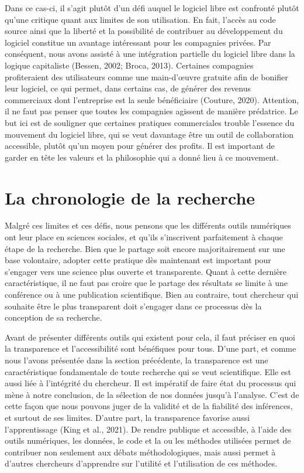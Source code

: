 \documentclass[
  letterpaper,
  DIV=11,
  numbers=noendperiod]{scrreprt}
\begin{document}
Dans ce cas-ci, il s'agit plutôt d'un défi auquel le logiciel libre est
confronté plutôt qu'une critique quant aux limites de son utilisation.
En fait, l'accès au code source ainsi que la liberté et la possibilité
de contribuer au développement du logiciel constitue un avantage
intéressant pour les compagnies privées. Par conséquent, nous avons
assisté à une intégration partielle du logiciel libre dans la logique
capitaliste (Bessen, 2002; Broca, 2013). Certaines compagnies
profiteraient des utilisateurs comme une main-d'œuvre gratuite afin de
bonifier leur logiciel, ce qui permet, dans certains cas, de générer des
revenus commerciaux dont l'entreprise est la seule bénéficiaire
(Couture, 2020). Attention, il ne faut pas penser que toutes les
compagnies agissent de manière prédatrice. Le but ici est de souligner
que certaines pratiques commerciales trouble l'essence du mouvement du
logiciel libre, qui se veut davantage être un outil de collaboration
accessible, plutôt qu'un moyen pour générer des profits. Il est
important de garder en tête les valeurs et la philosophie qui a donné
lieu à ce mouvement.

\hypertarget{la-chronologie-de-la-recherche}{%
\section{La chronologie de la
recherche}\label{la-chronologie-de-la-recherche}}

Malgré ces limites et ces défis, nous pensons que les différents outils
numériques ont leur place en sciences sociales, et qu'ils s'inscrivent
parfaitement à chaque étape de la recherche. Bien que le partage soit
encore majoritairement sur une base volontaire, adopter cette pratique
dès maintenant est important pour s'engager vers une science plus
ouverte et transparente. Quant à cette dernière caractéristique, il ne
faut pas croire que le partage des résultats se limite à une conférence
ou à une publication scientifique. Bien au contraire, tout chercheur qui
souhaite être le plus transparent doit s'engager dans ce processus dès
la conception de sa recherche.

Avant de présenter différents outils qui existent pour cela, il faut
préciser en quoi la transparence et l'accessibilité sont bénéfiques pour
tous. D'une part, et comme nous l'avons présentée dans la section
précédente, la transparence est une caractéristique fondamentale de
toute recherche qui se veut scientifique. Elle est aussi liée à
l'intégrité du chercheur. Il est impératif de faire état du processus
qui mène à notre conclusion, de la sélection de nos données jusqu'à
l'analyse. C'est de cette façon que nous pouvons juger de la validité et
de la fiabilité des inférences, et surtout de ses limites. D'autre part,
la transparence favorise aussi l'apprentissage (King et al., 2021). De
rendre publique et accessible, à l'aide des outils numériques, les
données, le code et la ou les méthodes utilisées permet de contribuer
non seulement aux débats méthodologiques, mais aussi permet à d'autres
chercheurs d'apprendre sur l'utilité et l'utilisation de ces méthodes.
\end{document}
